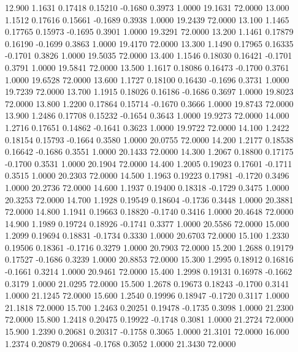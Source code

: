   12.900   1.1631   0.17418   0.15210  -0.1680   0.3973   1.0000  19.1631  72.0000
  13.000   1.1512   0.17616   0.15661  -0.1689   0.3938   1.0000  19.2439  72.0000
  13.100   1.1465   0.17765   0.15973  -0.1695   0.3901   1.0000  19.3291  72.0000
  13.200   1.1461   0.17879   0.16190  -0.1699   0.3863   1.0000  19.4170  72.0000
  13.300   1.1490   0.17965   0.16335  -0.1701   0.3826   1.0000  19.5035  72.0000
  13.400   1.1546   0.18030   0.16421  -0.1701   0.3791   1.0000  19.5841  72.0000
  13.500   1.1617   0.18086   0.16473  -0.1700   0.3761   1.0000  19.6528  72.0000
  13.600   1.1727   0.18100   0.16430  -0.1696   0.3731   1.0000  19.7239  72.0000
  13.700   1.1915   0.18026   0.16186  -0.1686   0.3697   1.0000  19.8023  72.0000
  13.800   1.2200   0.17864   0.15714  -0.1670   0.3666   1.0000  19.8743  72.0000
  13.900   1.2486   0.17708   0.15232  -0.1654   0.3643   1.0000  19.9273  72.0000
  14.000   1.2716   0.17651   0.14862  -0.1641   0.3623   1.0000  19.9722  72.0000
  14.100   1.2422   0.18154   0.15793  -0.1664   0.3580   1.0000  20.0755  72.0000
  14.200   1.2177   0.18538   0.16642  -0.1686   0.3551   1.0000  20.1433  72.0000
  14.300   1.2067   0.18800   0.17175  -0.1700   0.3531   1.0000  20.1904  72.0000
  14.400   1.2005   0.19023   0.17601  -0.1711   0.3515   1.0000  20.2303  72.0000
  14.500   1.1963   0.19223   0.17981  -0.1720   0.3496   1.0000  20.2736  72.0000
  14.600   1.1937   0.19400   0.18318  -0.1729   0.3475   1.0000  20.3253  72.0000
  14.700   1.1928   0.19549   0.18604  -0.1736   0.3448   1.0000  20.3881  72.0000
  14.800   1.1941   0.19663   0.18820  -0.1740   0.3416   1.0000  20.4648  72.0000
  14.900   1.1989   0.19724   0.18926  -0.1741   0.3377   1.0000  20.5586  72.0000
  15.000   1.2099   0.19694   0.18831  -0.1734   0.3330   1.0000  20.6703  72.0000
  15.100   1.2330   0.19506   0.18361  -0.1716   0.3279   1.0000  20.7903  72.0000
  15.200   1.2688   0.19179   0.17527  -0.1686   0.3239   1.0000  20.8853  72.0000
  15.300   1.2995   0.18912   0.16816  -0.1661   0.3214   1.0000  20.9461  72.0000
  15.400   1.2998   0.19131   0.16978  -0.1662   0.3179   1.0000  21.0295  72.0000
  15.500   1.2678   0.19673   0.18243  -0.1700   0.3141   1.0000  21.1245  72.0000
  15.600   1.2540   0.19996   0.18947  -0.1720   0.3117   1.0000  21.1818  72.0000
  15.700   1.2463   0.20251   0.19478  -0.1735   0.3098   1.0000  21.2300  72.0000
  15.800   1.2418   0.20475   0.19922  -0.1748   0.3081   1.0000  21.2724  72.0000
  15.900   1.2390   0.20681   0.20317  -0.1758   0.3065   1.0000  21.3101  72.0000
  16.000   1.2374   0.20879   0.20684  -0.1768   0.3052   1.0000  21.3430  72.0000
